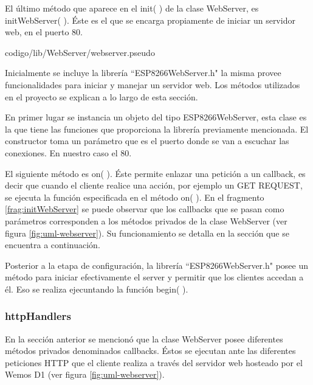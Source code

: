         El último método que aparece en el init( ) de la clase WebServer, es initWebServer( ). Éste es el que se encarga propiamente de iniciar un servidor web, en el puerto 80.
        
        
                         {codigo/lib/WebServer/webserver.pseudo}
    
        Inicialmente se incluye la librería ``ESP8266WebServer.h" la misma provee funcionalidades para iniciar y manejar un servidor web. Los métodos utilizados en el proyecto se explican a lo largo de esta sección.
        
        En primer lugar se instancia un objeto del tipo ESP8266WebServer, esta clase es la que tiene las funciones que proporciona la librería previamente mencionada. El constructor toma un parámetro que es el puerto donde se van a escuchar las conexiones. En nuestro caso el 80.
        
        El siguiente método es on( ). Éste permite enlazar una petición a un callback, es decir que cuando el cliente realice una acción, por ejemplo un GET REQUEST, se ejecuta la función especificada en el método on( ). En el fragmento \ref{frag:initWebServer} se puede observar que los callbacks que se pasan como parámetros corresponden a los métodos privados de la clase WebServer (ver figura \ref{fig:uml-webserver}). Su funcionamiento se detalla en la sección que se encuentra a continuación.
    
        Posterior a la etapa de configuración, la librería ``ESP8266WebServer.h" posee un método para iniciar efectivamente el server y permitir que los clientes accedan a él. Eso se realiza ejecuntando la función begin( ).
                         
    
        \subsubsection{httpHandlers}
        En la sección anterior se mencionó que la clase WebServer posee diferentes métodos privados denominados callbacks. Éstos se ejecutan ante las diferentes peticiones HTTP que el cliente realiza a través del servidor web hosteado por el Wemos D1 (ver figura \ref{fig:uml-webserver}).
    

